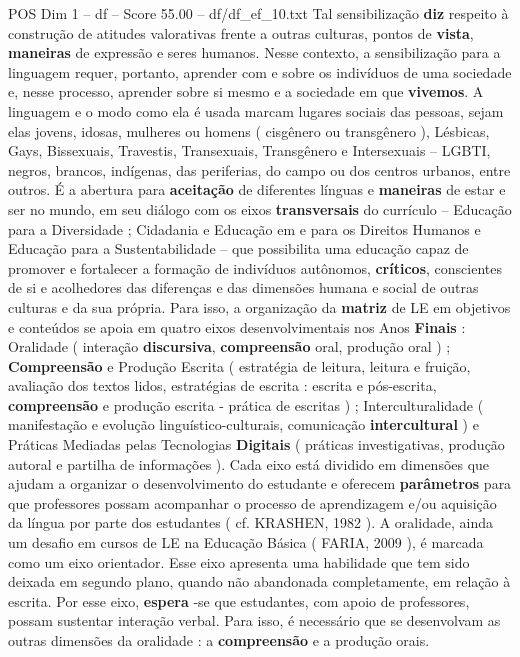 \begin{textsample}{POS Dim 1 – df – Score 55.00 – df/df\_ef\_10.txt}
Tal sensibilização \textbf{diz} respeito à construção de atitudes valorativas frente a outras culturas, pontos de \textbf{vista}, \textbf{maneiras} de expressão e seres humanos.
Nesse contexto, a sensibilização para a linguagem requer, portanto, aprender com e sobre os indivíduos de uma sociedade e, nesse processo, aprender sobre si mesmo e a sociedade em que \textbf{vivemos}.
A linguagem e o modo como ela é usada marcam lugares sociais das pessoas, sejam elas jovens, idosas, mulheres ou homens ( cisgênero ou transgênero ), Lésbicas, Gays, Bissexuais, Travestis, Transexuais, Transgênero e Intersexuais – LGBTI, negros, brancos, indígenas, das periferias, do campo ou dos centros urbanos, entre outros.
É a abertura para \textbf{aceitação} de diferentes línguas e \textbf{maneiras} de estar e ser no mundo, em seu diálogo com os eixos \textbf{transversais} do currículo – Educação para a Diversidade ; Cidadania e Educação em e para os Direitos Humanos e Educação para a Sustentabilidade – que possibilita uma educação capaz de promover e fortalecer a formação de indivíduos autônomos, \textbf{críticos}, conscientes de si e acolhedores das diferenças e das dimensões humana e social de outras culturas e da sua própria.
Para isso, a organização da \textbf{matriz} de LE em objetivos e conteúdos se apoia em quatro eixos desenvolvimentais nos Anos \textbf{Finais} : Oralidade ( interação \textbf{discursiva}, \textbf{compreensão} oral, produção oral ) ; \textbf{Compreensão} e Produção Escrita ( estratégia de leitura, leitura e fruição, avaliação dos textos lidos, estratégias de escrita : escrita e pós-escrita, \textbf{compreensão} e produção escrita - prática de escritas ) ; Interculturalidade ( manifestação e evolução linguístico-culturais, comunicação \textbf{intercultural} ) e Práticas Mediadas pelas Tecnologias \textbf{Digitais} ( práticas investigativas, produção autoral e partilha de informações ).
Cada eixo está dividido em dimensões que ajudam a organizar o desenvolvimento do estudante e oferecem \textbf{parâmetros} para que professores possam acompanhar o processo de aprendizagem e/ou aquisição da língua por parte dos estudantes ( cf.
KRASHEN, 1982 ).
A oralidade, ainda um desafio em cursos de LE na Educação Básica ( FARIA, 2009 ), é marcada como um eixo orientador.
Esse eixo apresenta uma habilidade que tem sido deixada em segundo plano, quando não abandonada completamente, em relação à escrita.
Por esse eixo, \textbf{espera} -se que estudantes, com apoio de professores, possam sustentar interação verbal.
Para isso, é necessário que se desenvolvam as outras dimensões da oralidade : a \textbf{compreensão} e a produção orais.

\end{textsample}
